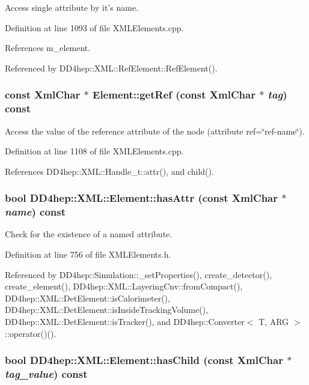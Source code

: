 Access single attribute by it's name. 

Definition at line 1093 of file XMLElements.cpp.

References m\_\-element.

Referenced by DD4hep::XML::RefElement::RefElement().\hypertarget{class_d_d4hep_1_1_x_m_l_1_1_element_a5a8a5fe4e0cfef155c88a8c444e3ef0b}{
\subsubsection[{getRef}]{\setlength{\rightskip}{0pt plus 5cm}const {\bf XmlChar} $\ast$ Element::getRef (const {\bf XmlChar} $\ast$ {\em tag}) const}}
\label{class_d_d4hep_1_1_x_m_l_1_1_element_a5a8a5fe4e0cfef155c88a8c444e3ef0b}


Access the value of the reference attribute of the node (attribute ref=\char`\"{}ref-\/name\char`\"{}). 

Definition at line 1108 of file XMLElements.cpp.

References DD4hep::XML::Handle\_\-t::attr(), and child().\hypertarget{class_d_d4hep_1_1_x_m_l_1_1_element_a6219f70c6e6cb89ea70f335afeca0957}{
\subsubsection[{hasAttr}]{\setlength{\rightskip}{0pt plus 5cm}bool DD4hep::XML::Element::hasAttr (const {\bf XmlChar} $\ast$ {\em name}) const}}
\label{class_d_d4hep_1_1_x_m_l_1_1_element_a6219f70c6e6cb89ea70f335afeca0957}


Check for the existence of a named attribute. 

Definition at line 756 of file XMLElements.h.

Referenced by DD4hep::Simulation::\_\-setProperties(), create\_\-detector(), create\_\-element(), DD4hep::XML::LayeringCnv::fromCompact(), DD4hep::XML::DetElement::isCalorimeter(), DD4hep::XML::DetElement::isInsideTrackingVolume(), DD4hep::XML::DetElement::isTracker(), and DD4hep::Converter$<$ T, ARG $>$::operator()().\hypertarget{class_d_d4hep_1_1_x_m_l_1_1_element_a8a8400cf5dacb724fa688e8fbb89b005}{
\subsubsection[{hasChild}]{\setlength{\rightskip}{0pt plus 5cm}bool DD4hep::XML::Element::hasChild (const {\bf XmlChar} $\ast$ {\em tag\_\-value}) const}}
\label{class_d_d4hep_1_1_x_m_l_1_1_element_a8a8400cf5dacb724fa688e8fbb89b005}


